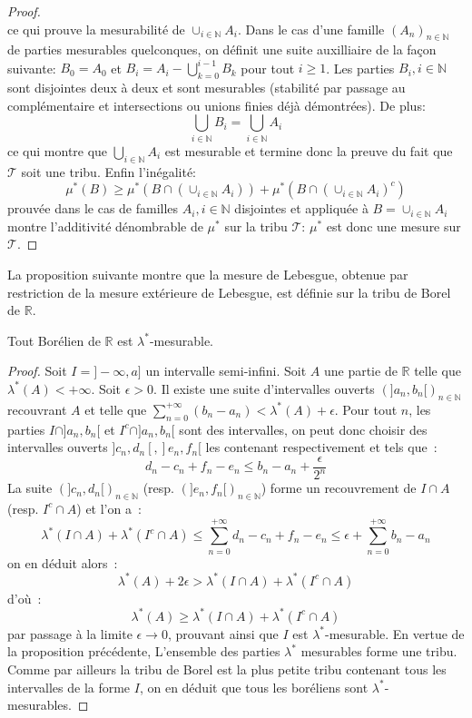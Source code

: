 \begin{proof}
\[\]
ce qui prouve la mesurabilité de $\cup_{i \in \mathbb{N}} A_i$.
Dans le cas d'une famille $(A_n)_{n \in
\mathbb{N}}$ de parties mesurables quelcon\-ques, on définit une
suite auxilliaire de la façon suivante: $B_0 = A_0$ et $B_i = A_i - \bigcup_{k=0}^{i-1}B_k$ pour tout $i \geq 1$.
Les parties $B_i, i \in \mathbb{N}$ sont disjointes deux à deux et sont
mesurables (stabilité par passage au complémentaire et intersections ou unions
finies déjà démontrées). De plus:
\[
\bigcup_{i \in \mathbb{N}}B_i = \bigcup_{i \in \mathbb{N}}A_i
\]
ce qui montre que $\bigcup_{i \in \mathbb{N}}A_i$ est mesurable et termine donc
la preuve du fait que $\mathcal{T}$ soit une tribu.
Enfin l'inégalité:
\[
\mu^*(B) \geq \mu^* \left (B \cap \left (\cup_{i \in \mathbb{N}} A_i \right ) \right ) + 
\mu^* \left (B \cap \left (\cup_{i \in \mathbb{N}} A_i \right )^c \right )
\]
prouvée dans le cas de familles $A_i, i\in \mathbb{N}$ disjointes et  appliquée
à $B = \cup_{i \in \mathbb{N}} A_i$ montre l'additivité dénombrable de $\mu^*$
sur la tribu $\mathcal{T}$: $\mu^*$ est donc une mesure sur $\mathcal{T}$.
\end{proof}
La proposition suivante montre que la mesure de Lebesgue, obtenue par
restriction de la mesure extérieure de Lebesgue, est définie sur la
tribu de Borel de $\mathbb{R}$.
\begin{mandatory}
\begin{prop}\label{prop:3}Tout Borélien de $\mathbb{R}$ est
$\lambda^*$-mesurable.
\end{prop}
\end{mandatory}
\begin{proof}
 Soit $I = ]-\infty, a]$ un intervalle semi-infini. Soit $A$ une
partie de $\mathbb{R}$ telle que $\lambda^*(A) < +\infty$. Soit
$\epsilon > 0$. Il existe une suite d'intervalles ouverts $(]a_n,
b_n[)_{n \in \mathbb{N}}$ recouvrant $A$ et telle que $\sum_{n=0}^{+\infty}(b_n-a_n) <
\lambda^*(A)+\epsilon$. Pour tout $n$, les parties $I \cap ]a_n, b_n[$ et $I^c \cap
]a_n, b_n[$ sont des intervalles, on peut donc choisir des intervalles
ouverts $]c_n, d_n[,]e_n, f_n[$ les contenant respectivement et tels
que~:
\[
d_n-c_n+f_n-e_n \leq b_n-a_n + \frac{\epsilon}{2^n}
\]
La suite $(]c_n, d_n[)_{n \in \mathbb{N}}$ (resp. $(]e_n, f_n[)_{n \in
    \mathbb{N}}$) forme un recouvrement
de $I \cap A$ (resp. $I^c \cap A$) et l'on a~:
\[
\lambda^*(I\cap A) + \lambda^*(I^c\cap A) \leq \sum_{n=0}^{+\infty}
d_n-c_n+f_n-e_n \leq \epsilon + \sum_{n=0}^{+\infty}  b_n-a_n
\]
on en déduit alors~:
\[
\lambda^*(A) + 2 \epsilon > \lambda^*(I\cap A) + \lambda^*(I^c\cap A)
\]
d'où~:
\[
\lambda^*(A)  \geq \lambda^*(I\cap A) + \lambda^*(I^c\cap A)
\]
par passage à la limite $\epsilon \to 0$, prouvant ainsi que $I$ est
$\lambda^*$-mesurable. En vertue de la proposition précédente, L'ensemble des
parties $\lambda^*$ mesurables forme une tribu. Comme par ailleurs la tribu de Borel est la plus
petite tribu contenant tous  les intervalles de la forme $I$, on en déduit que
tous les boréliens sont $\lambda^*$-mesurables.
\end{proof}
